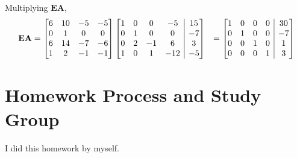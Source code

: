 \documentclass[]{article}
\begin{document}
Multiplying \(\mathbf{EA}\), 
\begin{align}
	\mathbf{EA} &= 
	\begin{bmatrix}
	6 & 10 & -5 & -5 \\
	0 & 1 & 0 & 0 \\
	6 & 14 & -7 & -6 \\
	1 & 2 & -1 & -1 \\
	\end{bmatrix}
	\left[\begin{array}{@{}cccc|c@{}}
	1 & 0 & 0 & -5 & 15 \\
	0 & 1 & 0 & 0 & -7 \\
	0 & 2 & -1 & 6 & 3 \\
	1 & 0 & 1 & -12 & -5
	\end{array}\right]
	&=
	\left[\begin{array}{@{}cccc|c@{}}
	1 & 0 & 0 & 0 & 30 \\
	0 & 1 & 0 & 0 & -7 \\
	0 & 0 & 1 & 0 & 1 \\
	0 & 0 & 0 & 1 & 3
	\end{array}\right]
\end{align}

\section{Homework Process and Study Group}

I did this homework by myself. 

\newpage

%
\end{document}
